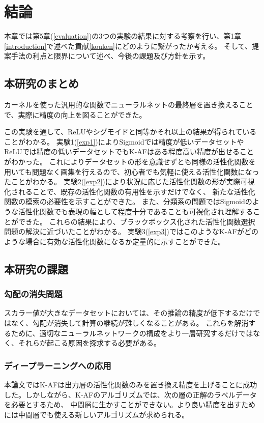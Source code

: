 \chapter{結論}
\label{conclusion}

本章では第5章(\ref{evaluation})の3つの実験の結果に対する考察を行い、第1章\ref{introduction}で述べた貢献\ref{kouken}にどのように繋がったか考える。
そして、提案手法の利点と限界について述べ、今後の課題及び方針を示す。


\section{本研究のまとめ}

カーネルを使った汎用的な関数でニューラルネットの最終層を置き換えることで、実際に精度の向上を図ることができた。

この実験を通して、ReLUやシグモイドと同等かそれ以上の結果が得られていることがわかる。
 実験1(\ref{exp1})によりSigmoidでは精度が低いデータセットやReLUでは精度の低いデータセットでもK-AFはある程度高い精度が出せることがわかった。
これによりデータセットの形を意識せずとも同様の活性化関数を用いても問題なく画集を行えるので、初心者でも気軽に使える活性化関数になったことがわかる。
 実験2(\ref{exp2})により状況に応じた活性化関数の形が実際可視化されることで、既存の活性化関数の有用性を示すだけでなく、
 新たな活性化関数の模索の必要性を示すことができた。
 また、分類系の問題ではSigmoidのような活性化関数でも表現の幅として程度十分であることも可視化され理解することができた。
これらの結果により、ブラックボックス化された活性化関数選択問題の解決に近づいたことがわかる。
 実験3(\ref{exp3})ではこのようなK-AFがどのような場合に有効な活性化関数になるか定量的に示すことができた。



\section{本研究の課題}

\subsection{勾配の消失問題}
スカラー値が大きなデータセットにおいては、その推論の精度が低下するだけではなく、勾配が消失して計算の継続が難しくなることがある。
これらを解消するために、適切なニューラルネットワークの構成をより一層研究するだけではなく、それらが起こる原因を探求する必要がある。



\subsection{ディープラーニングへの応用}
本論文ではK-AFは出力層の活性化関数のみを置き換え精度を上げることに成功した。しかしながら、K-AFのアルゴリズムでは、次の層の正解のラベルデータを必要とするため、
中間層に生かすことができない。より良い精度を出すためには中間層でも使える新しいアルゴリズムが求められる。



